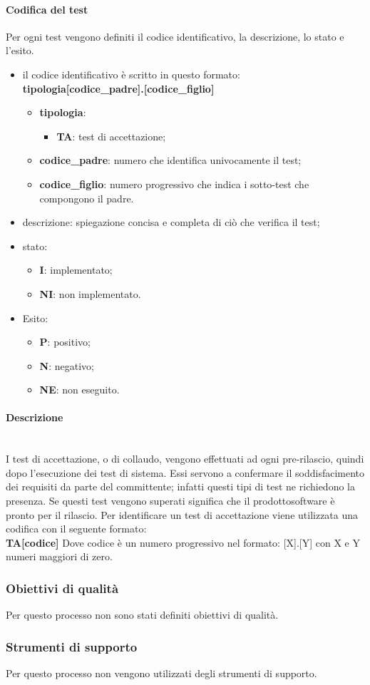			\paragraph*{Codifica del test}
			Per ogni test vengono definiti il codice identificativo, la descrizione, lo stato e l'esito.
			\begin{itemize}
				\item il codice identificativo è scritto in questo formato:\\
				\textbf{tipologia[codice\_padre].[codice\_figlio]}
				\begin{itemize}
					\item \textbf{tipologia}:
					\begin{itemize}
						\item \textbf{TA}: test di accettazione;
					\end{itemize}
					\item \textbf{codice\_padre}: numero che identifica univocamente il test;
					\item \textbf{codice\_figlio}: numero progressivo che indica i sotto-test che compongono il padre. 
				\end{itemize}
				\item descrizione: spiegazione concisa e completa di ciò che verifica il test;
				\item stato:
				\begin{itemize}
					\item \textbf{I}: implementato;
					\item \textbf{NI}: non implementato.
				\end{itemize}
				\item Esito:
				\begin{itemize}
					\item \textbf{P}: positivo;
					\item \textbf{N}: negativo;
					\item \textbf{NE}: non eseguito.
				\end{itemize}
			\end{itemize}
			\paragraph*{Descrizione} \mbox{}\\ [1mm]
			I test di accettazione, o di collaudo, vengono effettuati ad ogni pre-rilascio, quindi dopo l'esecuzione dei test di sistema. Essi servono a confermare il soddisfacimento dei requisiti da parte del committente; infatti questi tipi di test ne richiedono la presenza. Se questi test vengono superati significa che il prodotto\glosp software è pronto per il rilascio. 
			Per identificare un test di accettazione viene utilizzata una codifica con il seguente formato:\\
			\textbf{TA[codice]}
			Dove codice è un numero progressivo nel formato: [X].[Y] con X e Y numeri maggiori di zero.
	\subsubsection{Obiettivi di qualità}
		Per questo processo non sono stati definiti obiettivi di qualità.
	\subsubsection{Strumenti di supporto}
		Per questo processo non vengono utilizzati degli strumenti di supporto.
